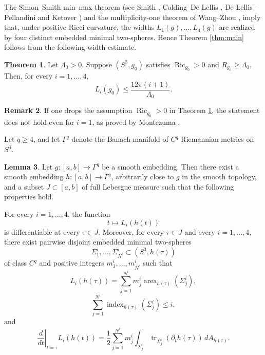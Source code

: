 \documentclass[12pt,english]{amsart}
\theoremstyle{definition}
\newtheorem{theorem}{Theorem}[section]
\newtheorem{lemma}[theorem]{Lemma}
\newtheorem{remark}[theorem]{Remark}
\begin{document}
The Simon--Smith min--max theorem (see Smith \cite{SS}, Colding--De Lellis \cite{CD}, De Lellis--Pellandini \cite{DP} and Ketover \cite{K}) and the multiplicity-one theorem of Wang--Zhou \cite{WZ}, imply that, under positive Ricci curvature, the widths \(L_1(g),\ldots,L_4(g)\) are realized by four distinct embedded minimal two-spheres. Hence Theorem \ref{thm:main} follows from the following width estimate.

\begin{theorem}
\label{thm:higher-ss-width-bound}
Let \(\Lambda_0>0\). Suppose \((S^3,g_0)\) satisfies \(\operatorname{Ric}_{g_0}>0\) and \(R_{g_0}\ge \Lambda_0\).
Then, for every \(i=1,\ldots,4\),
\[
L_i(g_0)\le \frac{12\pi(i+1)}{\Lambda_0}.
\]
\end{theorem}

\begin{remark}
    If one drops the assumption \(\operatorname{Ric}_{g_0}>0\) in Theorem \ref{thm:higher-ss-width-bound}, the statement does not hold even for \(i=1\), as proved by Montezuma \cite{M}.
\end{remark}

Let \(q\ge 4\), and let \(\Gamma^q\) denote the Banach manifold of \(C^q\) Riemannian metrics on \(S^3\).

\begin{lemma}
\label{lem:higher-ss-derivative}
Let \(g:[a,b]\to \Gamma^q\) be a smooth embedding. Then there exist a smooth embedding \(h:[a,b]\to \Gamma^q\), arbitrarily close to \(g\) in the smooth topology, and a subset \(J\subset [a,b]\) of full Lebesgue measure such that the following properties hold.

For every \(i=1,\ldots,4\), the function
\[
t\longmapsto L_i(h(t))
\]
is differentiable at every \(\tau\in J\). Moreover, for every \(\tau\in J\) and every \(i=1,\ldots,4\), there exist pairwise disjoint embedded minimal two-spheres
\[
\Sigma^i_{1},\ldots,\Sigma^i_{N^i}
\subset (S^3,h(\tau))
\]
of class \(C^q\) and positive integers \(m^i_{1},\ldots,m^i_{N^i}\) such that
\[
L_i(h(\tau))
=
\sum_{j=1}^{N^i}
m^i_{j}\operatorname{area}_{h(\tau)}(\Sigma^i_{j}),
\]
\[
\sum_{j=1}^{N^i}
\operatorname{index}_{h(\tau)}(\Sigma^i_{j})
\le i,
\]
and
\[
\left.\frac{d}{dt}\right|_{t=\tau}L_i(h(t))
=
\frac12
\sum_{j=1}^{N^i}
m^i_{j}
\int_{\Sigma^i_{j}}
\operatorname{tr}_{\Sigma^i_{j}}(\partial_t h(\tau))\,dA_{h(\tau)}.
\]
\end{lemma}
\end{document}
